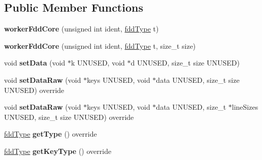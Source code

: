 \subsection*{Public Member Functions}
\begin{DoxyCompactItemize}
\item 
\hypertarget{classfaster_1_1workerFddCore_a83405d10b12b6a2c52e05ce6aa154a58}{}\label{classfaster_1_1workerFddCore_a83405d10b12b6a2c52e05ce6aa154a58} 
{\bfseries worker\+Fdd\+Core} (unsigned int ident, \hyperlink{namespacefaster_aa8898687bc64536b60a3d5f365060cd6}{fdd\+Type} t)
\item 
\hypertarget{classfaster_1_1workerFddCore_a916e1e6320f5d65f876ea8a13b8e4962}{}\label{classfaster_1_1workerFddCore_a916e1e6320f5d65f876ea8a13b8e4962} 
{\bfseries worker\+Fdd\+Core} (unsigned int ident, \hyperlink{namespacefaster_aa8898687bc64536b60a3d5f365060cd6}{fdd\+Type} t, size\+\_\+t size)
\item 
\hypertarget{classfaster_1_1workerFddCore_aadc1b6c29965af371b2c6b3f246108f6}{}\label{classfaster_1_1workerFddCore_aadc1b6c29965af371b2c6b3f246108f6} 
void {\bfseries set\+Data} (void $\ast$k U\+N\+U\+S\+ED, void $\ast$d U\+N\+U\+S\+ED, size\+\_\+t size U\+N\+U\+S\+ED)
\item 
\hypertarget{classfaster_1_1workerFddCore_ad18325128eb5c84bf1ce2c14dd885ec8}{}\label{classfaster_1_1workerFddCore_ad18325128eb5c84bf1ce2c14dd885ec8} 
void {\bfseries set\+Data\+Raw} (void $\ast$keys U\+N\+U\+S\+ED, void $\ast$data U\+N\+U\+S\+ED, size\+\_\+t size U\+N\+U\+S\+ED) override
\item 
\hypertarget{classfaster_1_1workerFddCore_ac41afe052888d211137a09702ab19ac8}{}\label{classfaster_1_1workerFddCore_ac41afe052888d211137a09702ab19ac8} 
void {\bfseries set\+Data\+Raw} (void $\ast$keys U\+N\+U\+S\+ED, void $\ast$data U\+N\+U\+S\+ED, size\+\_\+t $\ast$line\+Sizes U\+N\+U\+S\+ED, size\+\_\+t size U\+N\+U\+S\+ED) override
\item 
\hypertarget{classfaster_1_1workerFddCore_a76c12aa66cb7baebdb63688f7599dd41}{}\label{classfaster_1_1workerFddCore_a76c12aa66cb7baebdb63688f7599dd41} 
\hyperlink{namespacefaster_aa8898687bc64536b60a3d5f365060cd6}{fdd\+Type} {\bfseries get\+Type} () override
\item 
\hypertarget{classfaster_1_1workerFddCore_a2782ab77ddb4a72cf4f84af84072efba}{}\label{classfaster_1_1workerFddCore_a2782ab77ddb4a72cf4f84af84072efba} 
\hyperlink{namespacefaster_aa8898687bc64536b60a3d5f365060cd6}{fdd\+Type} {\bfseries get\+Key\+Type} () override
\item 

\end{DoxyCompactItemize}
